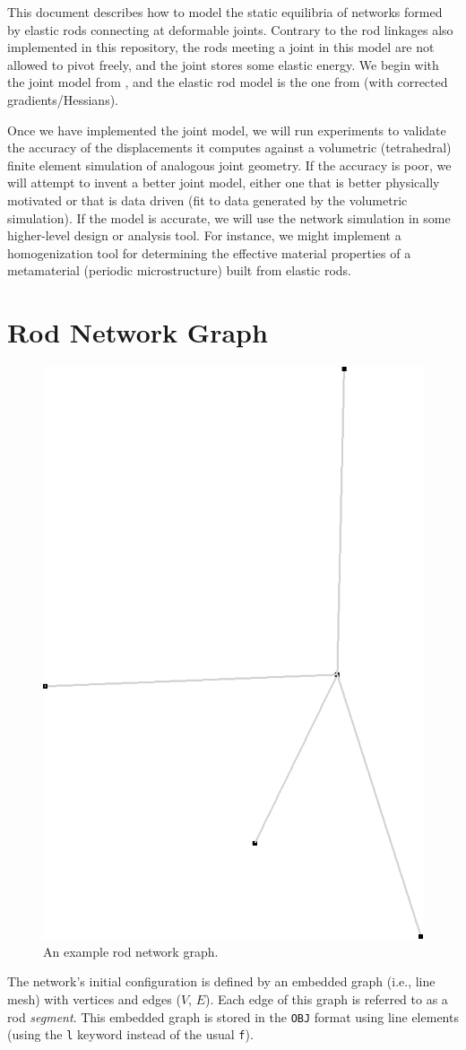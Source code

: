 \documentclass[10pt]{article}
\title{\documenttitle}
\author{Julian Panetta}
\begin{document}
\maketitle

This document describes how to model the static equilibria of networks formed
by elastic rods connecting at deformable joints. Contrary to the rod linkages
also implemented in this repository, the rods meeting a joint in this model
are not allowed to pivot freely, and the joint stores some elastic energy.
We begin with the joint model from \cite{Perez2015}, and the elastic rod model is the one
from \cite{Bergou2010} (with corrected gradients/Hessians).

Once we have implemented the joint model, we will run experiments to validate
the accuracy of the displacements it computes against a volumetric
(tetrahedral) finite element simulation of analogous joint geometry. If the
accuracy is poor, we will attempt to invent a better joint model, either one
that is better physically motivated or that is data driven (fit to data
generated by the volumetric simulation).
If the model is accurate, we will use the network simulation in some higher-level
design or analysis tool. For instance, we might implement a homogenization tool
for determining the effective material properties of a metamaterial (periodic
microstructure) built from elastic rods.

\section{Rod Network Graph}
\begin{figure}[h]
    \centering
    \includegraphics[width=.25\textwidth]{images/network_screenshot.png}
    \caption{An example rod network graph.}
    \label{fig:network_example}
\end{figure}
The network's initial configuration is defined by an embedded graph (i.e., line
mesh) with vertices and edges ($V$, $E$).
Each edge of this graph is referred to as a rod \emph{segment}. This embedded graph
is stored in the \texttt{OBJ} format using line elements (using the \texttt{l}
keyword instead of the usual \texttt{f}).
\end{document}
